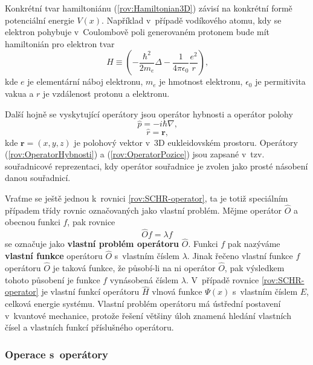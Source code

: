 Konkrétní tvar hamiltoniánu (\ref{rov:Hamiltonian3D}) závisí na konkrétní formě potenciální energie $V(x)$. Například v~případě vodíkového atomu, kdy se elektron pohybuje v~Coulombově poli generovaném protonem bude mít hamiltonián pro elektron tvar
\begin{equation}
\hat{H} \equiv \left( -\frac{\hbar^2}{2m_e}\Delta - \frac{1}{4 \pi \epsilon_0}\frac{e^2}{r} \right) \mbox{,}
\label{rov:HamiltonianVodik}
\end{equation}
kde $e$ je elementární náboj elektronu, $m_e$ je hmotnost elektronu, $\epsilon_0$ je permitivita vakua a $r$ je vzdálenost protonu a elektronu.

Další hojně se vyskytující operátory jsou operátor hybnosti a operátor polohy
\begin{equation}
\hat{p}= -i\hbar \nabla \mbox{,}
\label{rov:OperatorHybnosti}
\end{equation}
\begin{equation}
\hat{r} = \mathbf{r} \mbox{,}
\label{rov:OperatorPozice}
\end{equation}
kde $\mathbf{r}=(x,y,z)$ je polohový vektor v~3D eukleidovském prostoru. Operátory (\ref{rov:OperatorHybnosti}) a (\ref{rov:OperatorPozice}) jsou zapsané v~tzv. souřadnicové reprezentaci, kdy operátor souřadnice je zvolen jako prosté násobení danou souřadnicí.

Vraťme se ještě jednou k~rovnici \eqref{rov:SCHR-operator}, ta je totiž speciálním případem třídy rovnic označovaných jako vlastní problém. Mějme operátor $\hat{O}$ a obecnou funkci $f$, pak rovnice
\begin{equation}
\boxed{\hat{O} f = \lambda f}
\label{rov:VlastniProblem}
\end{equation}
se označuje jako \textbf{vlastní problém operátoru} $\hat{O}$. Funkci $f$ pak nazýváme \textbf{vlastní funkce} operátoru $\hat{O}$ s~vlastním číslem $\lambda$. Jinak řečeno vlastní funkce $f$ operátoru $\hat{O}$ je taková funkce, že působí-li na ni operátor $\hat{O}$, pak výsledkem tohoto působení je funkce $f$ vynásobená číslem $\lambda$. V~případě rovnice \eqref{rov:SCHR-operator} je vlastní funkcí operátoru $\hat{H}$ vlnová funkce $\Psi(x)$ s~vlastním číslem $E$, celková energie systému. Vlastní problém operátoru má ústřední postavení v~kvantové mechanice, protože řešení většiny úloh znamená hledání vlastních čísel a vlastních funkcí příslušného operátoru. 



\subsubsection{Operace s~operátory}
\label{kap:OperaceSOperatory}

